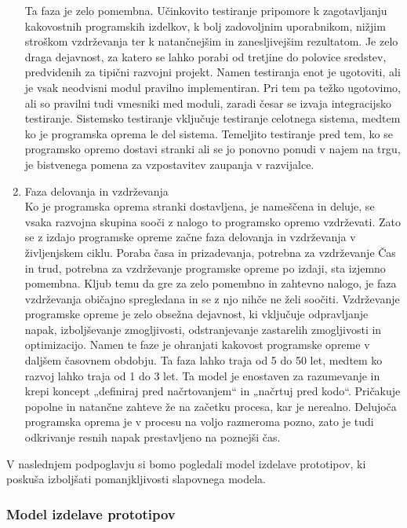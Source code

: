 \documentclass[a4paper,12pt,openright]{book}
\begin{document}
\begin{enumerate}
     Ta faza je zelo pomembna. Učinkovito testiranje pripomore k zagotavljanju kakovostnih programskih izdelkov, k bolj zadovoljnim uporabnikom, nižjim stroškom vzdrževanja ter k natančnejšim in zanesljivejšim rezultatom. Je zelo draga dejavnost, za katero se lahko porabi od tretjine do polovice sredstev, predvidenih za tipični razvojni projekt.
Namen testiranja enot je ugotoviti, ali je vsak neodvisni modul pravilno implementiran. Pri tem pa težko ugotovimo, ali so pravilni tudi vmesniki med moduli, zaradi česar se izvaja integracijsko testiranje. Sistemsko testiranje vključuje testiranje celotnega sistema, medtem ko je programska oprema le del sistema. Temeljito testiranje pred tem, ko se programsko opremo dostavi stranki ali se jo ponovno ponudi v najem na trgu, je bistvenega pomena za vzpostavitev zaupanja v razvijalce.
    \item Faza delovanja in vzdrževanja \\
    Ko je programska oprema stranki dostavljena, je nameščena in deluje, se vsaka razvojna skupina sooči z nalogo to programsko opremo vzdrževati. Zato se z izdajo programske opreme začne faza delovanja in vzdrževanja v življenjskem ciklu.
Poraba časa in prizadevanja, potrebna za vzdrževanje Čas in trud, potrebna za vzdrževanje programske opreme po izdaji, sta izjemno pomembna. Kljub temu da gre za zelo pomembno in zahtevno nalogo, je faza vzdrževanja običajno spregledana in se z njo nihče ne želi soočiti.
Vzdrževanje programske opreme je zelo obsežna dejavnost, ki vključuje odpravljanje napak, izboljševanje zmogljivosti, odstranjevanje zastarelih zmogljivosti in optimizacijo. Namen te faze je ohranjati kakovost programske opreme v daljšem časovnem obdobju. Ta faza lahko traja od 5 do 50 let, medtem ko razvoj lahko traja od 1 do 3 let.
Ta model je enostaven za razumevanje in krepi koncept „definiraj pred načrtovanjem“ in „načrtuj pred kodo“. Pričakuje popolne in natančne zahteve že na začetku procesa, kar je nerealno. Delujoča programska oprema je v procesu na voljo razmeroma pozno, zato je tudi odkrivanje resnih napak prestavljeno na poznejši čas.
\cite{aggarwal2005software, alshamrani2015comparison}
\end{enumerate}

V naslednjem podpoglavju si bomo pogledali model izdelave prototipov, ki poskuša izboljšati pomanjkljivosti slapovnega modela.


\pagebreak
\subsubsection{Model izdelave prototipov}
\end{document}
